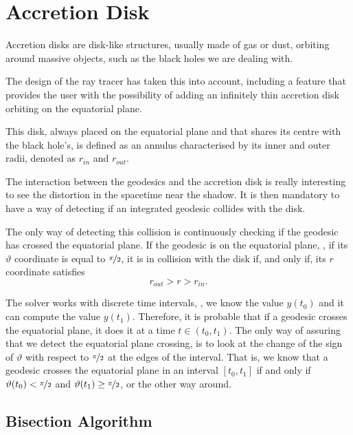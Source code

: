 \section{Accretion Disk}

Accretion disks are disk-like structures, usually made of gas or dust, orbiting around massive objects, such as the black holes we are dealing with.

The design of the ray tracer has taken this into account, including a feature that provides the user with the possibility of adding an infinitely thin accretion disk orbiting on the equatorial plane.

This disk, always placed on the equatorial plane and that shares its centre with the black hole's, is defined as an annulus characterised by its inner and outer radii, denoted as $r_{in}$ and $r_{out}$.

The interaction between the geodesics and the accretion disk is really interesting to see the distortion in the spacetime near the shadow. It is then mandatory to have a way of detecting if an integrated geodesic collides with the disk.

The only way of detecting this collision is continuously checking if the geodesic has crossed the equatorial plane. If the geodesic is on the equatorial plane, \ie, if its $\vartheta$ coordinate is equal to $\nicefrac{\pi}{2}$, it is in collision with the disk if, and only if, its $r$ coordinate satisfies
\begin{equation}
	\label{eq:collision}
	r_{out} > r > r_{in}.
\end{equation}

The solver works with discrete time intervals, \ie, we know the value $y(t_0)$ and it can compute the value $y(t_1)$. Therefore, it is probable that if a geodesic crosses the equatorial plane, it does it at a time $t \in (t_0, t_1)$. The only way of assuring that we detect the equatorial plane crossing, is to look at the change of the sign of $\vartheta$ with respect to $\nicefrac{\pi}{2}$ at the edges of the interval. That is, we know that a geodesic crosses the equatorial plane in an interval $[t_0, t_1]$ if and only if $\vartheta(t_0) < \nicefrac{\pi}{2}$ and $\vartheta(t_1) \geq \nicefrac{\pi}{2}$, or the other way around.

\subsection{Bisection Algorithm}

